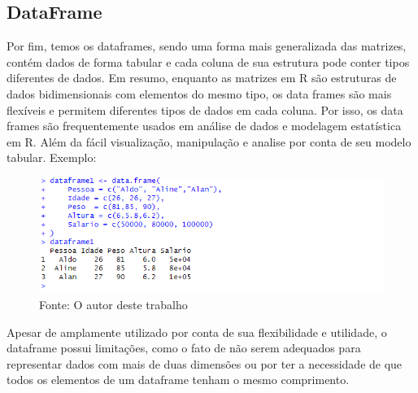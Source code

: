     \subsection{DataFrame}
    		Por fim, temos os dataframes, sendo uma forma mais generalizada das matrizes, contém dados de forma tabular e cada coluna de sua estrutura pode conter tipos diferentes de dados. Em resumo, enquanto as matrizes em R são estruturas de dados bidimensionais com elementos do mesmo tipo, os data frames são mais flexíveis e permitem diferentes tipos de dados em cada coluna. Por isso, os data frames são frequentemente usados em análise de dados e modelagem estatística em R. Além da fácil visualização, manipulação e analise por conta de seu modelo tabular. Exemplo:\begin{figure}[H]
    			\centering
    			\caption{}
    			\includegraphics[width=1.0\linewidth]{Prints/screenshot006}
    			\label{fig:screenshot006}
    			{\tiny \sf Fonte: O autor deste trabalho }
    		\end{figure}
    		Apesar de amplamente utilizado por conta de sua flexibilidade e utilidade, o dataframe possui limitações, como o fato de não serem adequados para representar dados com mais de duas dimensões ou por ter a necessidade de que todos os elementos de um dataframe tenham o mesmo comprimento.

